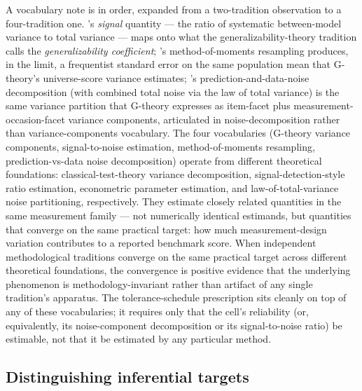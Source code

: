 \documentclass[11pt]{article}
\begin{document}
A vocabulary note is in order, expanded from a two-tradition observation to a four-tradition one. \citet{heineman2025signal}'s \emph{signal} quantity --- the ratio of systematic between-model variance to total variance --- maps onto what the generalizability-theory tradition calls the \emph{generalizability coefficient}; \citet{lior2025reliableeval}'s method-of-moments resampling produces, in the limit, a frequentist standard error on the same population mean that G-theory's universe-score variance estimates; \citet{wang2025measuringnoises}'s prediction-and-data-noise decomposition (with combined total noise via the law of total variance) is the same variance partition that G-theory expresses as item-facet plus measurement-occasion-facet variance components, articulated in noise-decomposition rather than variance-components vocabulary. The four vocabularies (G-theory variance components, signal-to-noise estimation, method-of-moments resampling, prediction-vs-data noise decomposition) operate from different theoretical foundations: classical-test-theory variance decomposition, signal-detection-style ratio estimation, econometric parameter estimation, and law-of-total-variance noise partitioning, respectively. They estimate closely related quantities in the same measurement family --- not numerically identical estimands, but quantities that converge on the same practical target: how much measurement-design variation contributes to a reported benchmark score. When independent methodological traditions converge on the same practical target across different theoretical foundations, the convergence is positive evidence that the underlying phenomenon is methodology-invariant rather than artifact of any single tradition's apparatus. The tolerance-schedule prescription sits cleanly on top of any of these vocabularies; it requires only that the cell's reliability (or, equivalently, its noise-component decomposition or its signal-to-noise ratio) be estimable, not that it be estimated by any particular method.

\subsection{Distinguishing inferential targets}
\label{sec:distinguishing-targets}
\end{document}
